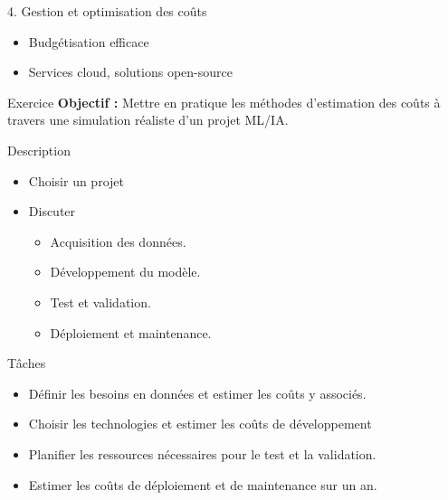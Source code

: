 \begin{frame}{4. Gestion et optimisation des coûts}
  \begin{itemize}
  \item Budgétisation efficace
  \item Services cloud, solutions open-source
  \end{itemize}
\end{frame}


\begin{frame}{Exercice}
  \textbf{Objectif :} Mettre en pratique les méthodes d'estimation des
  coûts à travers une simulation réaliste d'un projet ML/IA.
\end{frame}

\begin{frame}{Description}
  \begin{itemize}
  \item Choisir un projet
  \item Discuter
    \begin{itemize}
    \item Acquisition des données.
    \item Développement du modèle.
    \item Test et validation.
    \item Déploiement et maintenance.
    \end{itemize}
  \end{itemize}
\end{frame}

\begin{frame}{Tâches}
  \begin{itemize}
  \item Définir les besoins en données et estimer les coûts y associés.
  \item Choisir les technologies et estimer les coûts de développement
  \item Planifier les ressources nécessaires pour le test et la validation.
  \item Estimer les coûts de déploiement et de maintenance sur un an.
  \end{itemize}
\end{frame}


